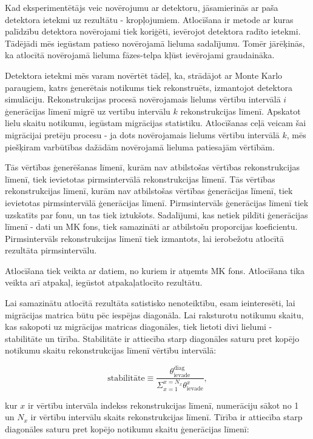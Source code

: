 Kad eksperimentētājs veic novērojumu ar detektoru, jāsamierinās ar paša detektora ietekmi uz rezultātu - kropļojumiem. \gls{Atlocīšana} ir metode ar kuras palīdzību detektora novērojami tiek koriģēti, ievērojot detektora radīto ietekmi. Tādējādi mēs iegūstam patieso novērojamā lieluma sadalījumu. Tomēr jārēķinās, ka atlocītā novērojamā lieluma fāzes-telpa kļūst ievērojami graudaināka. 

Detektora ietekmi mēs varam novērtēt tādēļ, ka, strādājot ar Monte Karlo paraugiem, katrs ģenerētais notikums tiek rekonstruēts, izmantojot detektora simulāciju. Rekonstrukcijas procesā novērojamais lielums vērtību intervālā $i$ ģenerācijas līmenī migrē uz vertību intervālu $k$ rekonstrukcijas līmenī. Apskatot lielu skaitu notikumu, iegūstam migrācijas statistiku. Atlocīšanas ceļā veicam šai migrācijai pretēju procesu - ja dots novērojamais lielums vērtību intervālā $k$, mēs piešķiram varbūtības dažādām novērojamā lieluma patiesajām vērtībām.

Tās \pullangle vērtības ģenerēšanas līmenī, kurām nav atbilstošas vērtības rekonstrukcijas līmenī, tiek ievietotas \gls{pirmsintervālā} rekonstrukcijas līmenī. Tās \pullangle vērtības rekonstrukcijas līmenī, kurām nav atbilstošas vērtības ģenerācijas līmenī, tiek ievietotas pirmsintervālā ģenerācijas līmenī. Pirmsintervāls ģenerācijas līmenī tiek uzskatīts par fonu, un tas tiek iztukšots. Sadalījumi, kas netiek pildīti ģenerācijas līmenī - dati un MK fons, tiek samazināti ar atbilstošu proporcijas koeficientu. Pirmsintervāls rekonstrukcijas līmenī tiek izmantots, lai ierobežotu atlocītā rezultāta pirmsintervālu. 

Atlocīšana tiek veikta ar datiem, no kuriem ir atņemts MK fons. Atlocīšana tika veikta arī atpakaļ, iegūstot atpakaļatlocīto rezultātu. 

Lai samazinātu atlocītā rezultāta satistisko nenoteiktību, esam ieinteresēti, lai migrācijas matrica būtu pēc iespējas diagonāla. Lai raksturotu notikumu skaitu, kas sakopoti uz migrācijas matricas diagonāles, tiek lietoti divi lielumi - stabilitāte un tīrība. Stabilitāte ir attiecība starp diagonāles saturu pret kopējo notikumu skaitu rekonstrukcijas līmenī vērtību intervālā:

\begin{equation}
  \text{stabilitāte}\equiv\frac{\theta^{\text{diag}}_{\text{ievade}}}{\Sigma_{x=1}^{x=N_{x}}\theta^{x}_{\text{ievade}}},
\end{equation}

kur $x$ ir vērtību intervāla indekss rekonstrukcijas līmenī, numerāciju sākot no 1 un $N_{x}$ ir vērtību intervālu skaits rekonstrukcijas līmenī. Tīrība ir attiecība starp diagonāles saturu pret kopējo notikumu skaitu ģenerācijas līmenī:


